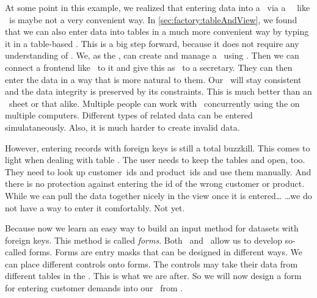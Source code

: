 %
%
At some point in this example, we realized that entering data into a \db\ via a \sql\ \client\ like \psql\ is maybe not a very convenient way.
In \cref{sec:factory:tableAndView}, we found that we can also enter data into tables in a much more convenient way by typing it in a table-based .
This is a big step forward, because it does not require any understanding of \sql.
We, as the , can create and manage a \db\ using \sql.
Then we can connect a frontend like \libreofficeBase\ to it and give this as \client\ to a secretary.
They can then enter the data in a way that is more natural to them.
Our \db\ will stay consistent and the data integrity is preserved by its constraints.
This is much better than an \microsoftExcel\ sheet or that alike.
Multiple people can work with \db\ concurrently using the  on multiple computers.
Different types of related data can be entered simulataneously.
Also, it is much harder to create invalid data.

However, entering records with foreign keys is still a total buzzkill.
This comes to light when dealing with table .
The user needs to keep the tables  and  open, too.
They need to look up customer~ids and product~ids and use them manually.
And there is no protection against entering the id of the wrong customer or product.
While we can pull the data together nicely in the view  once it is entered{\dots}
{\dots}we do not have a way to enter it comfortably.
Not yet.

Because now we learn an easy way to build an input method for datasets with foreign keys.
This method is called \emph{forms}.
Both \microsoftAccess\ and \libreofficeBase\ allow us to develop so-called forms.
Forms are entry masks that can be designed in different ways.
We can place different controls onto forms.
The controls may take their data from different tables in the \db.
This is what we are after.
So we will now design a form for entering customer demands into our \db\ from \libreofficeBase.

